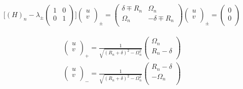 \documentclass[spanish]{article}
\begin{document}
\begin{equation}
\begin{split}
\bigg[(H)_n - \lambda_{\pm}
\begin{pmatrix}
	1 & 0\\
	0 & 1 \\
\end{pmatrix}\bigg]
\begin{pmatrix}
	u \\
	v \\
\end{pmatrix}_{\pm}=
\begin{pmatrix}
	\delta \mp R_n & \Omega_n \\
	\Omega_n & - \delta \mp R_n \\
\end{pmatrix}
\begin{pmatrix}
	u \\
	v \\
\end{pmatrix}_{\pm}
=\begin{pmatrix}
	0 \\
	0 \\
\end{pmatrix}
\end{split}
\end{equation}

\begin{equation}
\begin{split}
\begin{pmatrix}
	u \\
	v \\
\end{pmatrix}_+ = \frac{1}{\sqrt{(R_n+\delta)^2-\Omega_n^2}}
\begin{pmatrix}
	\Omega_n \\
	R_n - \delta \\
\end{pmatrix}
\\
\begin{pmatrix}
	u \\
	v \\
\end{pmatrix}_- = \frac{1}{\sqrt{(R_n+\delta)^2-\Omega_n^2}}
\begin{pmatrix}
	R_n - \delta \\
	-\Omega_n \\
\end{pmatrix}
\end{split}
\label{eigenvec}
\end{equation}
\end{document}
